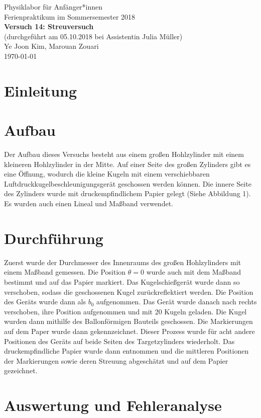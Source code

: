\documentclass[11pt,a4paper]{article}
\begin{document}
	

{
	\centering 
	\large 
	Physiklabor für Anfänger*innen \\
	Ferienpraktikum im Sommersemester 2018 \\[4mm]
	\textbf{\LARGE 
		Versuch 14: Streuversuch
	} \\[3mm]
	(durchgeführt am 05.10.2018 bei Assistentin Julia Müller) \\
	Ye Joon Kim, Marouan Zouari\\
	\today \\[10mm]
}

\tableofcontents
\section{Einleitung}



\section{Aufbau}
Der Aufbau dieses Versuchs besteht aus einem großen Hohlzylinder mit einem kleineren Hohlzylinder in der Mitte. Auf einer Seite des großen Zylinders gibt es eine Öffnung, wodurch die kleine Kugeln mit einem verschiebbaren Luftdruckkugelbeschleunigungsgerät geschossen werden können. Die innere Seite des Zylinders wurde mit druckempfindlichem Papier gelegt (Siehe Abbildung 1). Es wurden auch einen Lineal und Maßband verwendet. 

\section{Durchführung}
Zuerst wurde der Durchmesser des Innenraums des großen Hohlzylinders mit einem Maßband gemessen. Die Position $\theta = 0$ wurde auch mit dem Maßband bestimmt und auf das Papier markiert. Das Kugelschießgerät wurde dann so verschoben, sodass die geschossenen Kugel zurückreflektiert werden. Die Position des Geräts wurde dann als $b_0$ aufgenommen. Das Gerät wurde danach nach rechts verschoben, ihre Position aufgenommen und mit 20 Kugeln geladen. Die Kugel wurden dann mithilfe des Ballonförmigen Bauteils geschossen. Die Markierungen auf dem Paper wurde dann gekennzeichnet. Dieser Prozess wurde für acht andere Positionen des Geräts auf beide Seiten des Targetzylinders wiederholt. Das druckempfindliche Papier wurde dann entnommen und die mittleren Positionen der Markierungen sowie deren Streuung abgeschätzt und auf dem Papier gezeichnet. 


\section{Auswertung und Fehleranalyse}
\end{document}
